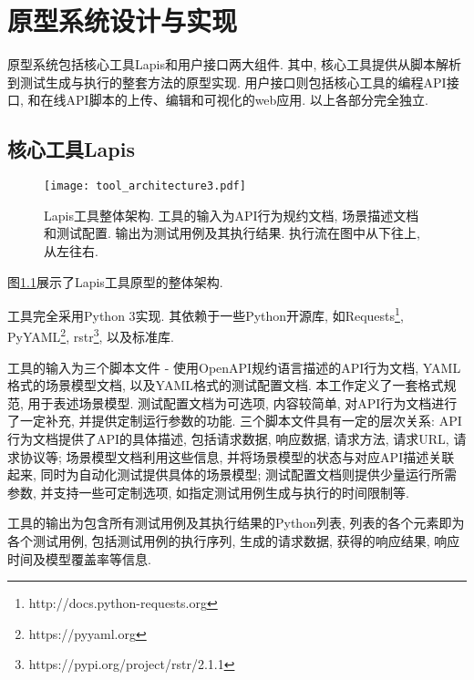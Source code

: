 \chapter{原型系统设计与实现}

    原型系统包括核心工具Lapis和用户接口两大组件. 其中, 核心工具提供从脚本解析到测试生成与执行的整套方法的原型实现. 用户接口则包括核心工具的编程API接口, 和在线API脚本的上传、编辑和可视化的web应用. 以上各部分完全独立.


	\section{核心工具Lapis}
	
	    \begin{figure}[!htb]
	        \centering
	        \texttt{[image: tool\_architecture3.pdf]}
	        \caption{Lapis工具整体架构. 工具的输入为API行为规约文档, 场景描述文档和测试配置. 输出为测试用例及其执行结果. 执行流在图中从下往上, 从左往右.}
	        \label{fig:lapis_arch}
	    \end{figure}
	    
	    图\ref{fig:lapis_arch}展示了Lapis工具原型的整体架构.
	    
	    工具完全采用Python 3实现. 其依赖于一些Python开源库, 如Requests\footnote{http://docs.python-requests.org}, PyYAML\footnote{https://pyyaml.org}, rstr\footnote{https://pypi.org/project/rstr/2.1.1}, 以及标准库.
	    
	    工具的输入为三个脚本文件 - 使用OpenAPI规约语言描述的API行为文档, YAML格式的场景模型文档, 以及YAML格式的测试配置文档. 本工作定义了一套格式规范, 用于表述场景模型. 测试配置文档为可选项, 内容较简单, 对API行为文档进行了一定补充, 并提供定制运行参数的功能. 三个脚本文件具有一定的层次关系: API行为文档提供了API的具体描述, 包括请求数据, 响应数据, 请求方法, 请求URL, 请求协议等; 场景模型文档利用这些信息, 并将场景模型的状态与对应API描述关联起来, 同时为自动化测试提供具体的场景模型; 测试配置文档则提供少量运行所需参数, 并支持一些可定制选项, 如指定测试用例生成与执行的时间限制等.
	    
	    \label{sec:lapis_impl}
	    工具的输出为包含所有测试用例及其执行结果的Python列表, 列表的各个元素即为各个测试用例, 包括测试用例的执行序列, 生成的请求数据, 获得的响应结果, 响应时间及模型覆盖率等信息.

